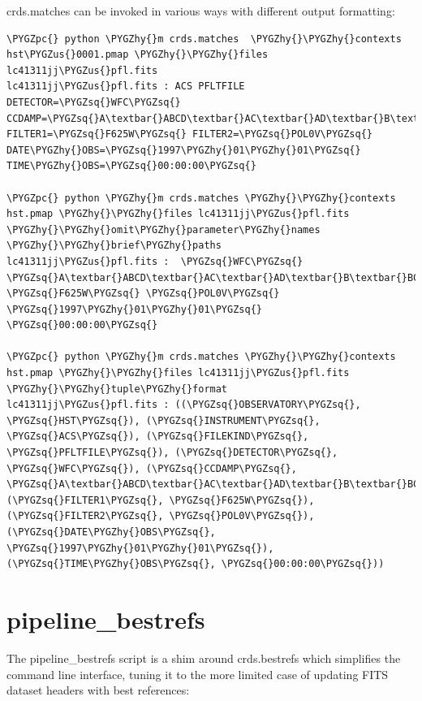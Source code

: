 \documentclass[letterpaper,10pt,english]{sphinxmanual}
\def\PYGZus{\char`\_}
\def\PYGZpc{\char`\%}
\def\PYGZhy{\char`\-}
\def\PYGZsq{\char`\'}
\begin{document}
crds.matches can be invoked in various ways with different output formatting:

\begin{Verbatim}[commandchars=\\\{\}]
\PYGZpc{} python \PYGZhy{}m crds.matches  \PYGZhy{}\PYGZhy{}contexts hst\PYGZus{}0001.pmap \PYGZhy{}\PYGZhy{}files lc41311jj\PYGZus{}pfl.fits
lc41311jj\PYGZus{}pfl.fits : ACS PFLTFILE DETECTOR=\PYGZsq{}WFC\PYGZsq{} CCDAMP=\PYGZsq{}A\textbar{}ABCD\textbar{}AC\textbar{}AD\textbar{}B\textbar{}BC\textbar{}BD\textbar{}C\textbar{}D\PYGZsq{} FILTER1=\PYGZsq{}F625W\PYGZsq{} FILTER2=\PYGZsq{}POL0V\PYGZsq{} DATE\PYGZhy{}OBS=\PYGZsq{}1997\PYGZhy{}01\PYGZhy{}01\PYGZsq{} TIME\PYGZhy{}OBS=\PYGZsq{}00:00:00\PYGZsq{}

\PYGZpc{} python \PYGZhy{}m crds.matches \PYGZhy{}\PYGZhy{}contexts hst.pmap \PYGZhy{}\PYGZhy{}files lc41311jj\PYGZus{}pfl.fits \PYGZhy{}\PYGZhy{}omit\PYGZhy{}parameter\PYGZhy{}names \PYGZhy{}\PYGZhy{}brief\PYGZhy{}paths
lc41311jj\PYGZus{}pfl.fits :  \PYGZsq{}WFC\PYGZsq{} \PYGZsq{}A\textbar{}ABCD\textbar{}AC\textbar{}AD\textbar{}B\textbar{}BC\textbar{}BD\textbar{}C\textbar{}D\PYGZsq{} \PYGZsq{}F625W\PYGZsq{} \PYGZsq{}POL0V\PYGZsq{} \PYGZsq{}1997\PYGZhy{}01\PYGZhy{}01\PYGZsq{} \PYGZsq{}00:00:00\PYGZsq{}

\PYGZpc{} python \PYGZhy{}m crds.matches \PYGZhy{}\PYGZhy{}contexts hst.pmap \PYGZhy{}\PYGZhy{}files lc41311jj\PYGZus{}pfl.fits \PYGZhy{}\PYGZhy{}tuple\PYGZhy{}format
lc41311jj\PYGZus{}pfl.fits : ((\PYGZsq{}OBSERVATORY\PYGZsq{}, \PYGZsq{}HST\PYGZsq{}), (\PYGZsq{}INSTRUMENT\PYGZsq{}, \PYGZsq{}ACS\PYGZsq{}), (\PYGZsq{}FILEKIND\PYGZsq{}, \PYGZsq{}PFLTFILE\PYGZsq{}), (\PYGZsq{}DETECTOR\PYGZsq{}, \PYGZsq{}WFC\PYGZsq{}), (\PYGZsq{}CCDAMP\PYGZsq{}, \PYGZsq{}A\textbar{}ABCD\textbar{}AC\textbar{}AD\textbar{}B\textbar{}BC\textbar{}BD\textbar{}C\textbar{}D\PYGZsq{}), (\PYGZsq{}FILTER1\PYGZsq{}, \PYGZsq{}F625W\PYGZsq{}), (\PYGZsq{}FILTER2\PYGZsq{}, \PYGZsq{}POL0V\PYGZsq{}), (\PYGZsq{}DATE\PYGZhy{}OBS\PYGZsq{}, \PYGZsq{}1997\PYGZhy{}01\PYGZhy{}01\PYGZsq{}), (\PYGZsq{}TIME\PYGZhy{}OBS\PYGZsq{}, \PYGZsq{}00:00:00\PYGZsq{}))
\end{Verbatim}


\section{pipeline\_bestrefs}
\label{command_line_tools:pipeline-bestrefs}
The pipeline\_bestrefs script is a shim around crds.bestrefs which simplifies the command line interface,
tuning it to the more limited case of updating FITS dataset headers with best references:
\end{document}
